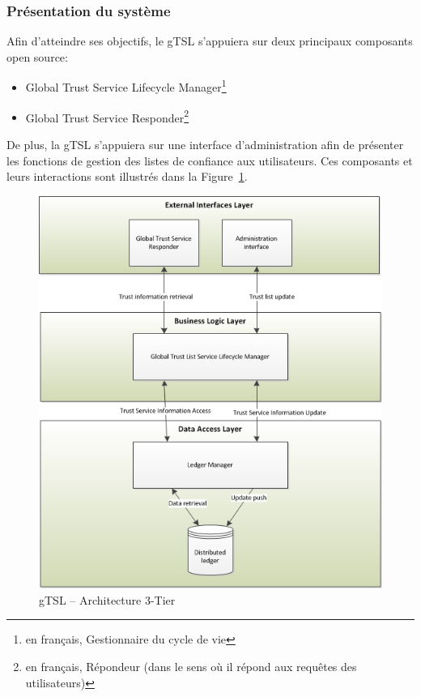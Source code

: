 \documentclass{tnreport}
\begin{document}
\subsubsection{Présentation du système}

Afin d'atteindre ses objectifs, le gTSL s'appuiera sur deux principaux composants open source:
\begin{itemize}
	\item Global Trust Service Lifecycle Manager\footnote{en français, Gestionnaire du cycle de vie}
	\item Global Trust Service Responder\footnote{en français, Répondeur (dans le sens où il répond aux requêtes des utilisateurs)}
\end{itemize}
De plus, la gTSL s'appuiera sur une interface d'administration afin de présenter les fonctions de gestion des listes de confiance aux utilisateurs.
Ces composants et leurs interactions sont illustrés dans la Figure~\ref{fig:3tier-archi}.

\begin{figure}[h]
	\centering
	\includegraphics{figures/gTSL-3Tier}
	\caption{gTSL – Architecture 3-Tier \cite{design-document}}
	\label{fig:3tier-archi}
\end{figure}
\end{document}
